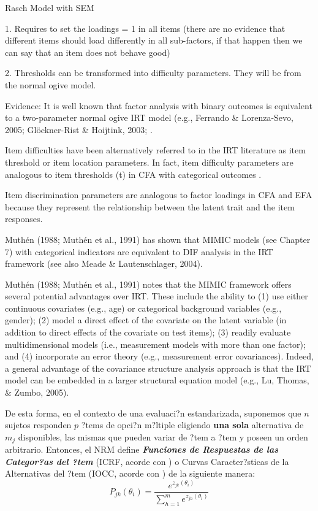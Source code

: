 Rasch Model with SEM

1. Requires to set the loadings = 1 in all items 
(there are no evidence that different items should load differently in all sub-factors, if that happen then we can say that an item does not behave good)

2. Thresholds can be transformed into difficulty parameters. They will be from the normal ogive model.


Evidence:
It is well known that factor analysis with binary outcomes is equivalent to a two-parameter normal ogive IRT model (e.g., Ferrando & Lorenza-Sevo, 2005; Glöckner-Rist & Hoijtink, 2003; \citep{Kamata_et_al_2008, Takane_et_al_1987}.

Item difficulties have been alternatively referred to in the IRT literature as item threshold or item location parameters. In fact, item difficulty parameters are analogous to item thresholds (t) in CFA with categorical outcomes \citep{Muthen_et_al_1991}.

Item discrimination parameters are analogous to factor loadings in CFA and EFA because they represent the relationship between the latent trait and the item  responses.

Muthén (1988; Muthén et al., 1991) has shown that MIMIC models (see Chapter 7) with categorical indicators are equivalent to DIF analysis in the IRT framework (see also Meade & Lautenschlager, 2004).

Muthén (1988; Muthén et al., 1991) notes that the MIMIC framework offers several potential advantages over IRT. These include the ability to (1) use either continuous covariates (e.g., age) or categorical background  variables (e.g., gender); (2) model a direct effect of the covariate on the latent variable (in addition to direct effects of the covariate on test items); (3) readily  evaluate multidimensional models (i.e., measurement models with more than one factor); and (4) incorporate an error theory (e.g., measurement error covariances). Indeed, a general advantage of the covariance structure analysis approach is that the IRT model can be  embedded in a larger structural equation model (e.g., Lu, Thomas, & Zumbo, 2005).


De esta forma, en el contexto de una evaluaci?n estandarizada, suponemos que $n$ sujetos responden $p$ ?tems de opci?n m?ltiple eligiendo \textbf{una sola} alternativa de $m_j$ disponibles, las mismas que pueden variar de ?tem a ?tem y poseen un orden arbitrario. Entonces, el NRM define \textbf{\textit{Funciones de Respuestas de las Categor?as del ?tem}} (ICRF, acorde con \citealp{Ostini2006}) o Curvas Caracter?sticas de la Alternativas del ?tem (IOCC, acorde con \citealp{Ham_Swam1991}) de la siguiente manera:
\begin{equation}
	P_{jk}(\theta_i) = \dfrac{e^{z_{jk}(\theta_i)}}{\sum_{h=1}^{m}e^{z_{jh}(\theta_i)}} 
\end{equation}

